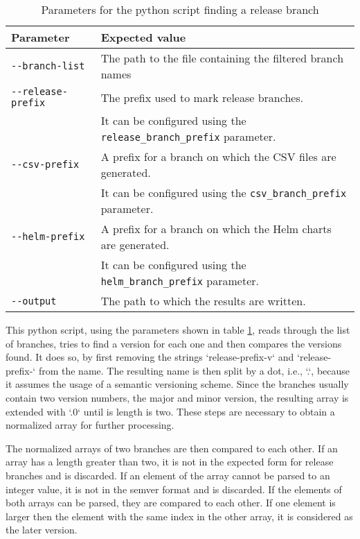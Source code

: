 \begin{table}
    \centering
    \caption{Parameters for the python script finding a release branch}
    \label{tab:py-finding-the-release-branch}
    \begin{tabular}{l|l}
        Parameter & Expected value \\
        \hline
        \verb|--branch-list| & The path to the file containing the filtered branch names \\
        \verb|--release-prefix| & The prefix used to mark release branches. \\
         & It can be configured using the \verb|release_branch_prefix| parameter. \\
        \verb|--csv-prefix| & A prefix for a branch on which the CSV files are generated. \\
        & It can be configured using the \verb|csv_branch_prefix| parameter. \\
        \verb|--helm-prefix| & A prefix for a branch on which the Helm charts are generated. \\
        & It can be configured using the \verb|helm_branch_prefix| parameter. \\
        \verb|--output| & The path to which the results are written. \\
    \end{tabular}
\end{table}

This python script, using the parameters shown in table \ref{tab:py-finding-the-release-branch}, reads through the list of branches, tries to find a version for each one and then compares the versions found.
It does so, by first removing the strings `{release-prefix}-v` and `{release-prefix}-` from the name.
The resulting name is then split by a dot, i.e., `.`, because it assumes the usage of a semantic versioning scheme.
Since the branches usually contain two version numbers, the major and minor version, the resulting array is extended with `.0` until is length is two.
These steps are necessary to obtain a normalized array for further processing.

The normalized arrays of two branches are then compared to each other.
If an array has a length greater than two, it is not in the expected form for release branches and is discarded.
If an element of the array cannot be parsed to an integer value, it is not in the semver format and is discarded.
If the elements of both arrays can be parsed, they are compared to each other.
If one element is larger then the element with the same index in the other array, it is considered as the later version.

